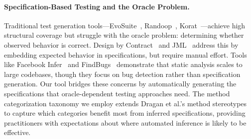 \paragraph{Specification-Based Testing and the Oracle Problem.}
Traditional test generation tools---EvoSuite~\cite{fraser2011evosuite}, Randoop~\cite{pacheco2007randoop}, Korat~\cite{boyapati2002korat}---achieve high structural coverage but struggle with the oracle problem: determining whether observed behavior is correct. Design by Contract~\cite{meyer1992design} and JML~\cite{jml, leavens2006design} address this by embedding expected behavior in specifications, but require manual effort. Tools like Facebook Infer~\cite{calcagno2015infer} and FindBugs~\cite{hovemeyer2004finding} demonstrate that static analysis scales to large codebases, though they focus on bug detection rather than specification generation. Our tool bridges these concerns by automatically generating the specifications that oracle-dependent testing approaches need. The method categorization taxonomy we employ extends Dragan et al.'s method stereotypes~\cite{dragan2006reverse} to capture which categories benefit most from inferred specifications, providing practitioners with expectations about where automated inference is likely to be effective.
